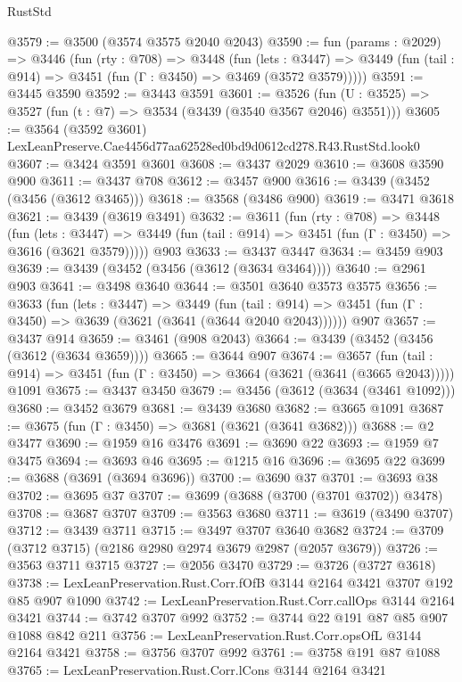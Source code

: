\begin{lexlean}{RustStd}
\begin{coremodule}
@3579 := @3500 (@3574 @3575 @2040 @2043)
@3590 := fun (params : @2029) =>
  @3446
    (fun (rty : @708) =>
    @3448
      (fun (lets : @3447) =>
      @3449 (fun (tail : @914) => @3451 (fun (Γ : @3450) => @3469 (@3572 @3579)))))
@3591 := @3445 @3590
@3592 := @3443 @3591
@3601 := @3526 (fun (U : @3525) => @3527 (fun (t : @7) => @3534 (@3439 (@3540 @3567 @2046) @3551)))
@3605 := @3564 (@3592 @3601) LexLeanPreserve.Cae4456d77aa62528ed0bd9d0612cd278.R43.RustStd.look0
@3607 := @3424 @3591 @3601
@3608 := @3437 @2029
@3610 := @3608 @3590 @900
@3611 := @3437 @708
@3612 := @3457 @900
@3616 := @3439 (@3452 (@3456 (@3612 @3465)))
@3618 := @3568 (@3486 @900)
@3619 := @3471 @3618
@3621 := @3439 (@3619 @3491)
@3632 := @3611
    (fun (rty : @708) =>
    @3448
      (fun (lets : @3447) =>
      @3449 (fun (tail : @914) => @3451 (fun (Γ : @3450) => @3616 (@3621 @3579)))))
    @903
@3633 := @3437 @3447
@3634 := @3459 @903
@3639 := @3439 (@3452 (@3456 (@3612 (@3634 @3464))))
@3640 := @2961 @903
@3641 := @3498 @3640
@3644 := @3501 @3640 @3573 @3575
@3656 := @3633
    (fun (lets : @3447) =>
    @3449
      (fun (tail : @914) => @3451 (fun (Γ : @3450) => @3639 (@3621 (@3641 (@3644 @2040 @2043))))))
    @907
@3657 := @3437 @914
@3659 := @3461 (@908 @2043)
@3664 := @3439 (@3452 (@3456 (@3612 (@3634 @3659))))
@3665 := @3644 @907
@3674 := @3657
    (fun (tail : @914) => @3451 (fun (Γ : @3450) => @3664 (@3621 (@3641 (@3665 @2043)))))
    @1091
@3675 := @3437 @3450
@3679 := @3456 (@3612 (@3634 (@3461 @1092)))
@3680 := @3452 @3679
@3681 := @3439 @3680
@3682 := @3665 @1091
@3687 := @3675 (fun (Γ : @3450) => @3681 (@3621 (@3641 @3682)))
@3688 := @2 @3477
@3690 := @1959 @16 @3476
@3691 := @3690 @22
@3693 := @1959 @7 @3475
@3694 := @3693 @46
@3695 := @1215 @16
@3696 := @3695 @22
@3699 := @3688 (@3691 (@3694 @3696))
@3700 := @3690 @37
@3701 := @3693 @38
@3702 := @3695 @37
@3707 := @3699 (@3688 (@3700 (@3701 @3702)) @3478)
@3708 := @3687 @3707
@3709 := @3563 @3680
@3711 := @3619 (@3490 @3707)
@3712 := @3439 @3711
@3715 := @3497 @3707 @3640 @3682
@3724 := @3709 (@3712 @3715) (@2186 @2980 @2974 @3679 @2987 (@2057 @3679))
@3726 := @3563 @3711 @3715
@3727 := @2056 @3470
@3729 := @3726 (@3727 @3618)
@3738 := LexLeanPreservation.Rust.Corr.fOfB @3144 @2164 @3421 @3707 @192 @85 @907 @1090
@3742 := LexLeanPreservation.Rust.Corr.callOps @3144 @2164 @3421
@3744 := @3742 @3707 @992
@3752 := @3744 @22 @191 @87 @85 @907 @1088 @842 @211
@3756 := LexLeanPreservation.Rust.Corr.opsOfL @3144 @2164 @3421
@3758 := @3756 @3707 @992
@3761 := @3758 @191 @87 @1088
@3765 := LexLeanPreservation.Rust.Corr.lCons @3144 @2164 @3421

\end{coremodule}
\end{lexlean}
